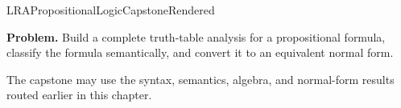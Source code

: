 \ifcsname LRAPropositionalLogicCapstoneRendered\endcsname
\else
\expandafter\gdef\csname LRAPropositionalLogicCapstoneRendered\endcsname{}

\newpage
{}
\label{cap:propositional-logic}

\begin{tcolorbox}[
  colback=gray!6,
  colframe=gray!40,
  arc=2pt,
  left=8pt, right=8pt, top=6pt, bottom=6pt,
  title={\small\textbf{Capstone Problem}},
  fonttitle=\small\bfseries
]
\textbf{Problem.}
Build a complete truth-table analysis for a propositional formula, classify the
formula semantically, and convert it to an equivalent normal form.
\end{tcolorbox}

\begin{remark*}
The capstone may use the syntax, semantics, algebra, and normal-form results
routed earlier in this chapter.
\end{remark*}

\clearpage
\fi
